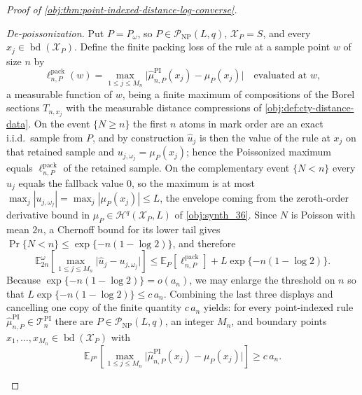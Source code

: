 \begin{proof}[Proof of \cref{obj:thm:point-indexed-distance-log-converse}]
\begin{enumerate}
\emph{De-poissonization.}  Put \(P=P_\omega\), so \(P\in\mathcal P_{\mathrm{NP}}(L,q)\), \(\mathcal X_P=S\), and every \(x_j\in\operatorname{bd}(\mathcal X_P)\).  Define the finite packing loss of the rule at a sample point \(w\) of size \(n\) by
\[
\ell^{\mathrm{pack}}_{n,P}(w)
=
\max_{1\le j\le M_n}\bigl|\widehat\mu^{\mathrm{PI}}_{n,P}(x_j)-\mu_P(x_j)\bigr|
\quad\text{evaluated at }w ,
\]
a measurable function of \(w\), being a finite maximum of compositions of the Borel sections \(T_{n,x_j}\) with the measurable distance compressions of \cref{obj:def:cty-distance-data}.
On the event \(\{N\ge n\}\) the first \(n\) atoms in mark order are an exact i.i.d.\ sample from \(P\), and by construction \(\widehat u_j\) is then the value of the rule at \(x_j\) on that retained sample and \(u_{j,\omega_j}=\mu_P(x_j)\); hence the Poissonized maximum equals \(\ell^{\mathrm{pack}}_{n,P}\) of the retained sample.
On the complementary event \(\{N<n\}\) every \(\widehat u_j\) equals the fallback value \(0\), so the maximum is at most \(\max_j|u_{j,\omega_j}|=\max_j|\mu_P(x_j)|\le L\), the envelope coming from the zeroth-order derivative bound in \(\mu_P\in\mathcal H^q(\mathcal X_P,L)\) of \cref{obj:synth_36}.
Since \(N\) is Poisson with mean \(2n\), a Chernoff bound for its lower tail gives \(\Pr\{N<n\}\le\exp\{-n(1-\log2)\}\), and therefore
\[
\mathbb E^{\omega}_{2n}\!\left[\max_{1\le j\le M_n}\bigl|\widehat u_j-u_{j,\omega_j}\bigr|\right]
\le
\mathbb E_{P}\!\left[\ell^{\mathrm{pack}}_{n,P}\right]
+
L\exp\{-n(1-\log 2)\} .
\]
Because \(\exp\{-n(1-\log2)\}=o(a_n)\), we may enlarge the threshold on \(n\) so that \(L\exp\{-n(1-\log2)\}\le c\,a_n\).
Combining the last three displays and cancelling one copy of the finite quantity \(c\,a_n\) yields: for every point-indexed rule \(\widehat\mu^{\mathrm{PI}}_{n,P}\in\mathcal T_n^{\mathrm{PI}}\) there are \(P\in\mathcal P_{\mathrm{NP}}(L,q)\), an integer \(M_n\), and boundary points \(x_1,\ldots,x_{M_n}\in\operatorname{bd}(\mathcal X_P)\) with
\[
\mathbb E_{P^n}\!\left[
\max_{1\leq j\leq M_n}
\bigl|\widehat\mu_{n,P}^{\mathrm{PI}}(x_j)-\mu_P(x_j)\bigr|
\right]
\geq c\,a_n .
\]


\end{enumerate}
\end{proof}
